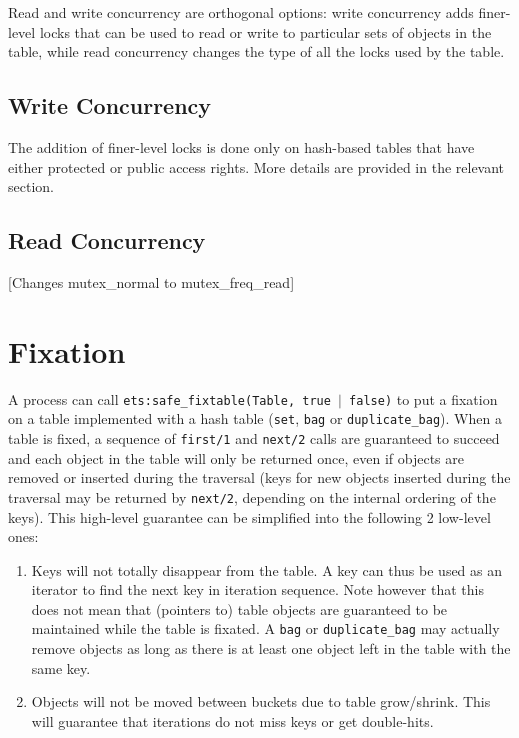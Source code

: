 \documentclass[aps,pre,preprint,nofootinbib]{revtex4}
\begin{document}
Read and write concurrency are orthogonal options:
write concurrency adds finer-level locks that can be used to read or write to particular sets of objects in the table, while read concurrency changes the type of all the locks used by the table.

\subsection{Write Concurrency}

The addition of finer-level locks is done only on hash-based tables that have either protected or public access rights.
More details are provided in the relevant section.

\subsection{Read Concurrency}

[Changes mutex\_normal to mutex\_freq\_read]

\section{Fixation}
\label{sec:fixation}

A process can call \texttt{ets:safe\_fixtable(Table, true $|$ false)} to put a fixation on a table implemented with a hash table (\verb|set|, \verb|bag| or \verb|duplicate_bag|).
When a table is fixed, a sequence of \verb|first/1| and \verb|next/2| calls are guaranteed to succeed and each object in the table will only be returned once, even if objects are removed or inserted during the traversal (keys for new objects inserted during the traversal may be returned by \verb|next/2|, depending on the internal ordering of the keys).
This high-level guarantee can be simplified into the following 2 low-level ones:

\begin{enumerate}
\item Keys will not totally disappear from the table.
  A key can thus be used as an iterator to find the next key in iteration sequence.
  Note however that this does not mean that (pointers to) table objects are guaranteed to be maintained while the table is fixated.
  A \verb|bag| or \verb|duplicate_bag| may actually remove objects as long as there is at least one object left in the table with the same key.
\item Objects will not be moved between buckets due to table grow/shrink.
  This will guarantee that iterations do not miss keys or get double-hits.
\end{enumerate}
\end{document}
